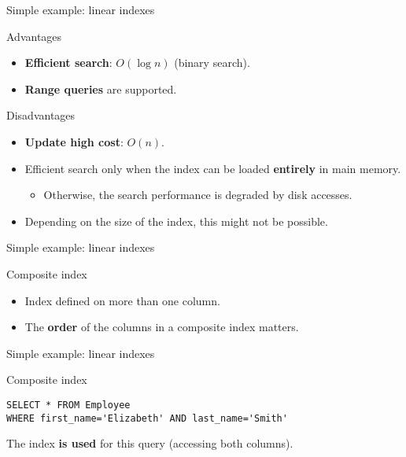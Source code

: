 \documentclass[xcolor=table]{beamer}
\begin{document}
\begin{frame}{Simple example: linear indexes}
  \begin{block}{Advantages}
  \begin{itemize}
    \item \textbf{Efficient search}: $O(\log n)$ (binary search).
    \item \textbf{Range queries} are supported.
  \end{itemize}
\end{block}
\vfill
  \begin{exampleblock}{Disadvantages}
  \begin{itemize}
  \item \textbf{Update high cost}: $O(n)$.
  \end{itemize}
  \begin{itemize}
    \item Efficient search only when the index can be loaded \textbf{entirely} 
    in main memory.
    \begin{itemize}
      \item Otherwise, the search performance is degraded by disk accesses.
    \end{itemize}
    \item Depending on the size of the index, this might not be possible.
  \end{itemize}
\end{exampleblock}
  \end{frame}

\begin{frame}{Simple example: linear indexes}
  \begin{block}{Composite index}
    \begin{itemize}
      \item Index defined on more than one column.
      \item The \textbf{order} of the columns in a composite index matters.
    \end{itemize}
    
  \end{block}
\vfill
  \begin{center}
\end{center}
\end{frame}

\begin{frame}[fragile]{Simple example: linear indexes}
\begin{block}{Composite index}
\begin{verbatim}
SELECT * FROM Employee 
WHERE first_name='Elizabeth' AND last_name='Smith' 
\end{verbatim}
The index {\bf is used} for this query (accessing both columns).  
\end{block}
  \begin{center}
  \end{center}
\end{frame}
\end{document}
